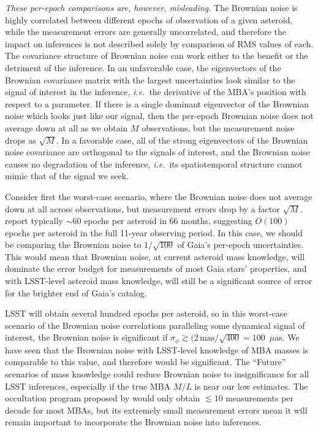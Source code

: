 \documentclass[linenumbers, onecolumn]{aastex631}
\newcommand{\ie}{\textit{i.e.\/}}
\newcommand\edited[1]{{\color{red} {#1}}}
\newcommand{\uas}{$\mu$as}
\begin{document}
\emph{These per-epoch comparisons are, however, misleading.} The
Brownian noise is highly correlated between different epochs of
observation of a given asteroid, while the measurement errors are
generally uncorrelated, and therefore the impact on inferences is not
described solely by comparison of RMS values of each.  The covariance
structure of Brownian noise can work either to the benefit or the
detriment of the inference.  In an unfavorable case, the eigenvectors
of the Brownian covariance matrix with the largest uncertainties look similar to the signal of interest in the inference, \ie\ the derivative of the MBA's position with respect to a parameter.  If there is a single dominant eigenvector of the Brownian noise which looks just like our signal, then the per-epoch Brownian noise does not average down at all as we obtain $M$ observations, but the measurement noise drops as $\sqrt{M}.$  In a favorable case, all of the strong eigenvectors of the Brownian noise covariance are orthogonal to the signals of interest, and the Brownian noise causes no degradation of the inference, \ie\ its spatiotemporal structure cannot mimic that of the signal we seek.

Consider first the worst-case scenario, where the Brownian noise does
not average down at all across observations, but measurement errors
drop by a factor $\sqrt{M}.$   \citet{gaiafpr} report typically $\sim60$ epochs per asteroid in 66 months, suggesting $O(100)$ epochs per asteroid in the full 11-year observing period. \edited{In this case, we should be comparing the Brownian noise to $1/\sqrt{100}$ of Gaia's per-epoch uncertainties.  This would mean that Brownian noise, at current asteroid mass knowledge, will dominate the error budget for measurements of most Gaia stars' properties, and with LSST-level asteroid mass knowledge, will still be a significant source of error for the brighter end of Gaia's catalog.}

LSST will obtain several hundred epochs per asteroid, \edited{so in this
  worst-case scenario of the Brownian noise correlations paralleling some
  dynamical signal of interest, the Brownian noise is significant if
  $\sigma_\phi \gtrsim (2\,\text{mas}/\sqrt{400}=100$~\uas.  We have seen that the Brownian noise with LSST-level knowledge of MBA masses is comparable to this value, and therefore would be significant.  The ``Future'' scenarios of mass knowledge could reduce Brownian noise to insignificance for all LSST inferences, especially if the true MBA $M/L$ is near our low estimates.}
The occultation program proposed by \citet{occultations} would only obtain
$\lesssim10$ measurements per decade for most MBAs, but its extremely small
measurement errors \edited{mean it will remain important to incorporate the Brownian
noise into inferences.}
\end{document}
